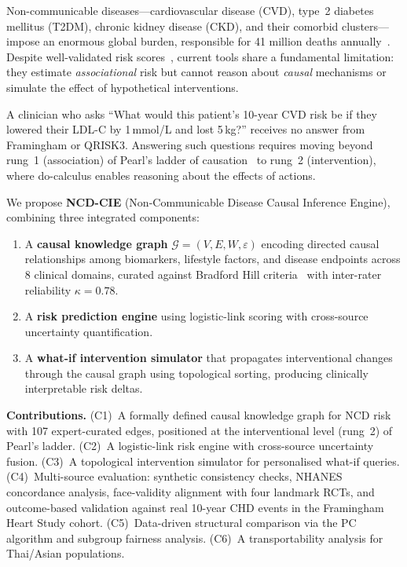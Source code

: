 \documentclass[runningheads]{llncs}
\begin{document}
Non-communicable diseases---cardiovascular disease (CVD), type~2
diabetes mellitus (T2DM), chronic kidney disease (CKD), and their
comorbid clusters---impose an enormous global burden, responsible for
41 million deaths annually~\cite{who2021ncd}.  Despite well-validated
risk scores~\cite{dagostino2008framingham, hippisley2017qrisk3,
score22021}, current tools share a fundamental limitation: they
estimate \emph{associational} risk but cannot reason about
\emph{causal} mechanisms or simulate the effect of hypothetical
interventions.

A clinician who asks ``What would this patient's 10-year CVD risk be
if they lowered their LDL-C by 1\,mmol/L and lost 5\,kg?'' receives
no answer from Framingham or QRISK3.  Answering such questions
requires moving beyond rung~1 (association) of Pearl's ladder of
causation~\cite{pearl2018book} to rung~2 (intervention), where
do-calculus enables reasoning about the effects of actions.

We propose \textbf{NCD-CIE} (Non-Communicable Disease Causal Inference
Engine), combining three integrated components:
\begin{enumerate}
\item A \textbf{causal knowledge graph} $\mathcal{G}=(V,E,W,\varepsilon)$
  encoding directed causal relationships among biomarkers, lifestyle
  factors, and disease endpoints across 8 clinical domains, curated
  against Bradford Hill criteria~\cite{hill1965environment} with
  inter-rater reliability $\kappa=0.78$.
\item A \textbf{risk prediction engine} using logistic-link scoring with
  cross-source uncertainty quantification.
\item A \textbf{what-if intervention simulator} that propagates
  interventional changes through the causal graph using topological
  sorting, producing clinically interpretable risk deltas.
\end{enumerate}

\noindent\textbf{Contributions.}
(C1)~A formally defined causal knowledge graph for NCD risk with 107
expert-curated edges, positioned at the interventional level (rung~2)
of Pearl's ladder.
(C2)~A logistic-link risk engine with cross-source uncertainty fusion.
(C3)~A topological intervention simulator for personalised what-if queries.
(C4)~Multi-source evaluation: synthetic consistency checks, NHANES
concordance analysis, face-validity alignment with four landmark RCTs,
and outcome-based validation against real 10-year CHD events in the
Framingham Heart Study cohort.
(C5)~Data-driven structural comparison via the PC algorithm and subgroup
fairness analysis.
(C6)~A transportability analysis for Thai/Asian populations.
\end{document}
